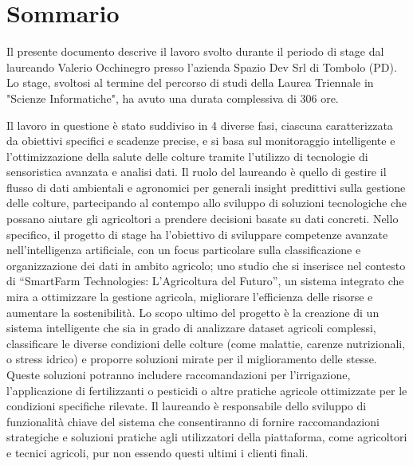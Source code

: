 \cleardoublepage
{}
{}
\begingroup
\let\clearpage\relax
\let\cleardoublepage\relax
\let\cleardoublepage\relax

\chapter*{Sommario}

Il presente documento descrive il lavoro svolto durante il periodo di stage dal laureando
Valerio Occhinegro presso l’azienda Spazio Dev Srl di Tombolo (PD). Lo stage, svoltosi al termine del percorso di studi della Laurea Triennale in "Scienze Informatiche", ha avuto una durata complessiva di 306 ore.

Il lavoro in questione è stato suddiviso in 4 diverse fasi, ciascuna caratterizzata da obiettivi specifici e scadenze precise, e si basa sul monitoraggio intelligente e l'ottimizzazione della salute delle colture tramite l'utilizzo di tecnologie di sensoristica avanzata e analisi dati. Il ruolo del laureando è quello di gestire il flusso di dati ambientali e agronomici per generali insight predittivi sulla gestione delle colture, partecipando al contempo allo sviluppo di soluzioni tecnologiche che possano aiutare gli agricoltori a prendere decisioni basate su dati concreti. 
Nello specifico, il progetto di stage ha l’obiettivo di sviluppare competenze avanzate nell’intelligenza artificiale, con un focus
particolare sulla classificazione e organizzazione dei dati in ambito agricolo; uno studio che si inserisce nel contesto di
“SmartFarm Technologies: L’Agricoltura del Futuro”, un sistema integrato che mira a ottimizzare la gestione agricola,
migliorare l’efficienza delle risorse e aumentare la sostenibilità.
Lo scopo ultimo del progetto è la creazione di un sistema intelligente che sia in grado di analizzare dataset agricoli complessi,
classificare le diverse condizioni delle colture (come malattie, carenze nutrizionali, o stress idrico) e proporre soluzioni
mirate per il miglioramento delle stesse. Queste soluzioni potranno includere raccomandazioni per l’irrigazione,
l’applicazione di fertilizzanti o pesticidi o altre pratiche agricole ottimizzate per le condizioni specifiche rilevate.
Il laureando è responsabile dello sviluppo di funzionalità chiave del sistema che consentiranno di fornire
raccomandazioni strategiche e soluzioni pratiche agli utilizzatori della piattaforma, come agricoltori e tecnici agricoli, pur non essendo questi ultimi i clienti finali. 






\endgroup

\vfill
